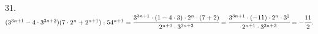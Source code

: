 31. $(3^{3n+1}-4\cdot3^{3n+2})(7\cdot2^n+2^{n+1}):54^{n+1}=\cfrac{3^{3n+1}\cdot(1-4\cdot3)\cdot2^n\cdot(7+2)}{2^{n+1}\cdot3^{3n+3}}=
\cfrac{3^{3n+1}\cdot(-11)\cdot2^n\cdot3^2}{2^{n+1}\cdot3^{3n+3}}=-\cfrac{11}{2}.$\\
